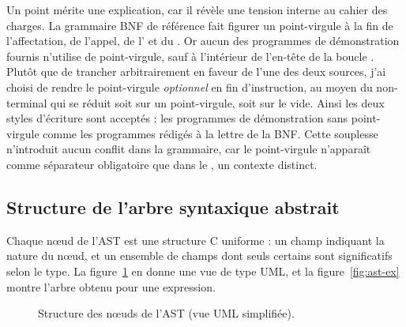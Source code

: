 Un point mérite une explication, car il révèle une tension interne au cahier des
charges. La grammaire BNF de référence fait figurer un point-virgule à la fin de
l'affectation, de l'appel, de l' et du . Or aucun
des programmes de démonstration fournis n'utilise de point-virgule, sauf à
l'intérieur de l'en-tête de la boucle . Plutôt que de trancher
arbitrairement en faveur de l'une des deux sources, j'ai choisi de rendre le
point-virgule \emph{optionnel} en fin d'instruction, au moyen du non-terminal
 qui se réduit soit sur un point-virgule, soit sur le vide. Ainsi les
deux styles d'écriture sont acceptés : les programmes de démonstration sans
point-virgule comme les programmes rédigés à la lettre de la BNF. Cette
souplesse n'introduit aucun conflit dans la grammaire, car le point-virgule
n'apparaît comme séparateur obligatoire que dans le , un contexte
distinct.

\subsection{Structure de l'arbre syntaxique abstrait}

Chaque n\oe ud de l'AST est une structure C uniforme : un champ 
indiquant la nature du n\oe ud, et un ensemble de champs dont seuls certains sont
significatifs selon le type. La figure~\ref{fig:ast-uml} en donne une vue de type
UML, et la figure~\ref{fig:ast-ex} montre l'arbre obtenu pour une expression.

\begin{figure}[ht]
\centering
{}
\caption{Structure des n\oe uds de l'AST (vue UML simplifiée).}
\label{fig:ast-uml}
\end{figure}

